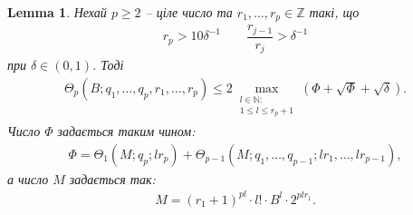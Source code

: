 \documentclass[a4paper, 10pt]{article}
\theoremstyle{theoremdd}
\theoremstyle{theoremdd}
\theoremstyle{theoremdd}
\theoremstyle{theoremdd}
\theoremstyle{theoremdd}
\theoremstyle{theoremdd}
\theoremstyle{theoremdd}
\theoremstyle{theoremdd}
\theoremstyle{theoremdd}
\theoremstyle{theoremdd}
\theoremstyle{theoremdd}
\theoremstyle{theoremdd}
\theoremstyle{theoremdd}
\newtheorem{lemma}[theorem]{Lemma}
\theoremstyle{theoremdd}
\theoremstyle{theoremdd}
\begin{document}
\begin{lemma}
Нехай $p \geq 2$ -- ціле число та $r_1,\dots,r_p \in \mathbb{Z}$ такі, що
\begin{align*}
r_p > 10\delta^{-1} \qquad \dfrac{r_{j-1}}{r_j} > \delta^{-1}
\end{align*}
при $\delta \in (0,1)$. Тоді
\begin{align*}
\Theta_p(B;q_1,\dots,q_p,r_1,\dots,r_p) \leq 2 \max_{\substack{l \in \mathbb{N}: \\ 1 \leq l \leq r_p+1 }} (\Phi + \sqrt{\Phi} + \sqrt{\delta}).
\end{align*}
Число $\Phi$ задається таким чином:
\begin{align*}
\Phi = \Theta_1(M;q_p;lr_p) + \Theta_{p-1}(M;q_1,\dots,q_{p-1};lr_1,\dots,lr_{p-1}),
\end{align*}
а число $M$ задається так:
\begin{align*}
M = (r_1+1)^{pl} \cdot l! \cdot B^l \cdot 2^{plr_1}.
\end{align*}
\end{lemma}
\end{document}
